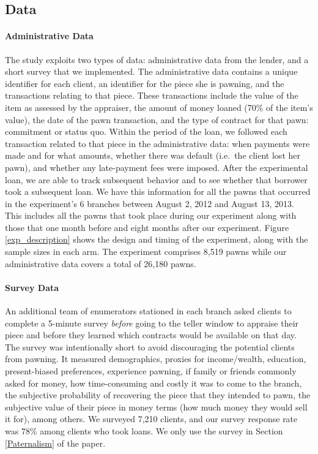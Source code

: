 \documentclass[12pt, a4paper]{article}
\begin{document}
\subsection{Data}

\paragraph*{Administrative Data}
The study exploits two types of data: administrative data from the lender, and a short survey that we implemented. The administrative data contains a unique identifier for each client, an identifier for the piece she is pawning, and the transactions relating to that piece. These transactions include the value of the item as assessed by the appraiser, the amount of money loaned (70\% of the item's value), the date of the pawn transaction, and the type of contract for that pawn: commitment or status quo. Within the period of the loan, we followed each transaction related to that piece in the administrative data: when payments were made and for what amounts, whether there was default (i.e.\ the client lost her pawn), and whether any late-payment fees were imposed. After the experimental loan, we are able to track subsequent behavior and to see whether that borrower took a subsequent loan.  We have this information for all the pawns that occurred in the experiment's 6 branches between August 2, 2012 and August 13, 2013. This includes all the pawns that took place during our experiment along with those that one month before and eight months after our experiment. Figure \ref{exp_description} shows the design and timing of the experiment, along with the sample sizes in each arm. The experiment comprises 8,519 pawns while our administrative data covers a total of 26,180 pawns.

\paragraph*{Survey Data} An additional team of enumerators stationed in each branch asked clients to complete a 5-minute survey \textit{before} going to the teller window to appraise their piece and before they learned which contracts would be available on that day. The survey was intentionally short to avoid discouraging the potential clients from pawning. It measured demographics, proxies for income/wealth, education, present-biased preferences, experience pawning, if family or friends commonly asked for money, how time-consuming and costly it was to come to the branch, the subjective probability of recovering the piece that they intended to pawn, the subjective value of their piece in money terms (how much money they would sell it for), among others. We surveyed 7,210 clients, and our survey response rate was 78\% among clients who took loans. %
We only use the survey in Section \ref{Paternalism} of the paper.
\end{document}
